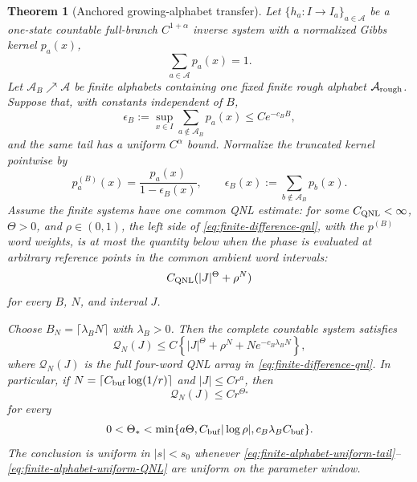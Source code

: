 \documentclass[11pt]{article}
\newtheorem{theorem}{Theorem}[section]
\begin{document}
\begin{theorem}[Anchored growing-alphabet transfer]
\label{thm:anchored-growing-alphabet-transfer}
Let $\{h_a:I\to I_a\}_{a\in\mathcal A}$ be a one-state countable
full-branch $C^{1+\alpha}$ inverse system with a normalized Gibbs kernel
$p_a(x)$,
\begin{equation}
\label{eq:full-gibbs-kernel-normalization}
 \sum_{a\in\mathcal A}p_a(x)=1.
\end{equation}
Let $\mathcal A_B\nearrow\mathcal A$ be finite alphabets containing one
fixed finite rough alphabet $\mathcal A_{\rm rough}$.  Suppose that, with
constants independent of $B$,
\begin{equation}
\label{eq:finite-alphabet-uniform-tail}
 \epsilon_B:=\sup_{x\in I}
 \sum_{a\notin\mathcal A_B}p_a(x)
 \le C e^{-c_BB},
\end{equation}
and the same tail has a uniform $C^\alpha$ bound.  Normalize the truncated
kernel pointwise by
\begin{equation}
\label{eq:finite-alphabet-normalized-kernel}
 p_a^{(B)}(x)=
 \frac{p_a(x)}{1-\epsilon_B(x)},
 \qquad
 \epsilon_B(x):=\sum_{b\notin\mathcal A_B}p_b(x).
\end{equation}
Assume the finite systems have one common QNL estimate: for some
$C_{\rm QNL}<\infty$, $\Theta>0$, and $\rho\in(0,1)$, the left side of
\eqref{eq:finite-difference-qnl}, with the $p^{(B)}$ word weights, is at
most the quantity below when the phase is evaluated at arbitrary reference
points in the common ambient word intervals:
\begin{equation}
\label{eq:finite-alphabet-uniform-QNL}
 C_{\rm QNL}(|J|^\Theta+\rho^N)
\end{equation}
for every $B$, $N$, and interval $J$.

Choose $B_N=\lceil\lambda_BN\rceil$ with $\lambda_B>0$.  Then the complete
countable system satisfies
\begin{equation}
\label{eq:growing-alphabet-full-QNL}
 \mathcal Q_N(J)
 \le C\left\{|J|^\Theta+\rho^N
       +N e^{-c_B\lambda_BN}\right\},
\end{equation}
where $\mathcal Q_N(J)$ is the full four-word QNL array in
\eqref{eq:finite-difference-qnl}.  In particular, if
$N=\lceil C_{\rm buf}\log(1/r)\rceil$ and $|J|\le C r^a$, then
\begin{equation}
\label{eq:growing-alphabet-PPE-power}
 \mathcal Q_N(J)\le C r^{\Theta_*}
\end{equation}
for every
\begin{equation}
\label{eq:growing-alphabet-PPE-exponent}
 0<\Theta_*<
 \min\{a\Theta,
 C_{\rm buf}|\log\rho|,
 c_B\lambda_BC_{\rm buf}\}.
\end{equation}
The conclusion is uniform in $|s|<s_0$ whenever
\eqref{eq:finite-alphabet-uniform-tail}--
\eqref{eq:finite-alphabet-uniform-QNL} are uniform on the parameter window.
\end{theorem}
\end{document}
